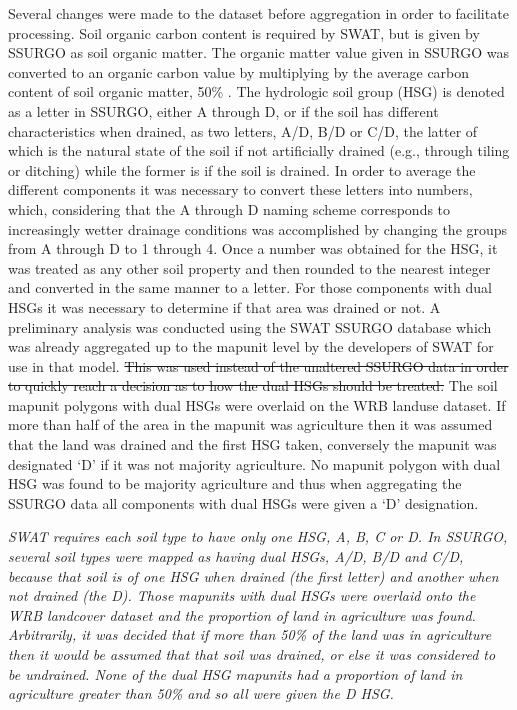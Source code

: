Several changes were made to the dataset before aggregation in order to facilitate processing. Soil organic carbon content is required by SWAT, but is given by SSURGO as soil organic matter. The organic matter value given in SSURGO was converted to an organic carbon value by multiplying by the average carbon content of soil organic matter, 50\% \citep{brady_introsoils_2002}. The hydrologic soil group (HSG) is denoted as a letter in SSURGO, either A through D, or if the soil has different characteristics when drained, as two letters, A/D, B/D or C/D, the latter of which is the natural state of the soil if not artificially drained (e.g., through tiling or ditching) while the former is if the soil is drained. In order to average the different components it was necessary to convert these letters into numbers, which, considering that the A through D naming scheme corresponds to increasingly wetter drainage conditions was accomplished by changing the groups from A through D to 1 through 4. Once a number was obtained for the HSG, it was treated as any other soil property and then rounded to the nearest integer and converted in the same manner to a letter. For those components with dual HSGs it was necessary to determine if that area was drained or not. A preliminary analysis was conducted using the SWAT SSURGO database which was already aggregated up to the mapunit level by the developers of SWAT for use in that model. \st{This was used instead of the unaltered SSURGO data in order to quickly reach a decision as to how the dual HSGs should be treated.} The soil mapunit polygons with dual HSGs were overlaid on the WRB landuse dataset. If more than half of the area in the mapunit was agriculture then it was assumed that the land was drained and the first HSG taken, conversely the mapunit was designated `D' if it was not majority agriculture. No mapunit polygon with dual HSG was found to be majority agriculture and thus when aggregating the SSURGO data all components with dual HSGs were given a `D' designation.

\textit{SWAT requires each soil type to have only one HSG, A, B, C or D. In SSURGO, several soil types were mapped as having dual HSGs, A/D, B/D and C/D, because that soil is of one HSG when drained (the first letter) and another when not drained (the D). Those mapunits with dual HSGs were overlaid onto the WRB landcover dataset and the proportion of land in agriculture was found. Arbitrarily, it was decided that if more than 50\% of the land was in agriculture then it would be assumed that that soil was drained, or else it was considered to be undrained. None of the dual HSG mapunits had a proportion of land in agriculture greater than 50\% and so all were given the D HSG.} 

